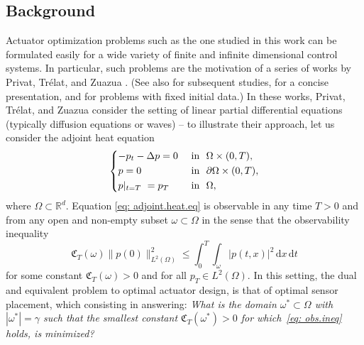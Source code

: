 \documentclass[journal,twoside,web]{ieeecolor}
\newcommand{\diff}{\, \mathrm{d}}
\newcommand{\del}{\partial}
\newcommand{\R}{\mathbb{R}}
\begin{document}
	\subsection{Background}
	
	Actuator optimization problems such as the one studied in this work can be formulated easily for a wide variety of finite and infinite dimensional control systems. In particular, such problems are the motivation of a series of works by Privat, Trélat, and Zuazua \cite{privat2013optimal-b,privat2013optimal-a, privat2015optimal, privat2016optimal, privat2017actuator, privat2019spectral}. (See also \cite{gimperlein2017deterministic, bergounioux2019position} for subsequent studies, \cite{trelat2018optimal} for a concise presentation, and \cite{morris2010linear, kalise2018optimal} for problems with fixed initial data.) In these works, Privat, Trélat, and Zuazua consider the setting of linear partial differential equations (typically diffusion equations or waves) -- to illustrate their approach, let us consider the adjoint heat equation
	\begin{equation} \label{eq: adjoint.heat.eq}
	\begin{dcases}
	-p_t - \Delta p = 0 &\text{ in } \Omega \times (0,T), \\
	p = 0 &\text{ in } \del \Omega \times (0,T), \\
	p|_{t=T} = p_T &\text{ in } \Omega,
	\end{dcases}
	\end{equation}
	where $\Omega\subset\R^d$. 
	Equation \eqref{eq: adjoint.heat.eq} is observable in any time $T>0$ and from any open and non-empty subset $\omega\subset\Omega$ in the sense that the observability inequality
	\begin{equation} \label{eq: obs.ineq}
	\mathfrak{C}_T({\omega}) \|p(0)\|_{L^2(\Omega)}^2 \leqslant \int_0^T \int_\omega |p(t,x)|^2 \diff x \diff t 
	\end{equation}
	for some constant $\mathfrak{C}_T(\omega)>0$ and for all $p_T\in L^2(\Omega)$. In this setting, the dual and equivalent problem to optimal actuator design, is that of optimal sensor placement, which consisting in answering:
	\emph{What is the domain $\omega^*\subset\Omega$ with $|\omega^*|=\gamma$ such that the smallest constant $\mathfrak{C}_T({\omega^*})>0$ for which \eqref{eq: obs.ineq} holds, is minimized?}
	
\end{document}
